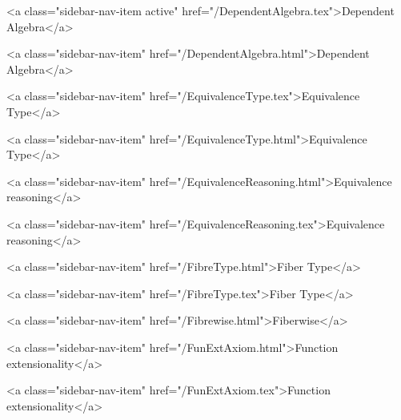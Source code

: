       
    
      
        
          <a class="sidebar-nav-item active" href="/DependentAlgebra.tex">Dependent Algebra</a>
        
      
    
      
        
          <a class="sidebar-nav-item" href="/DependentAlgebra.html">Dependent Algebra</a>
        
      
    
      
        
          <a class="sidebar-nav-item" href="/EquivalenceType.tex">Equivalence Type</a>
        
      
    
      
        
          <a class="sidebar-nav-item" href="/EquivalenceType.html">Equivalence Type</a>
        
      
    
      
        
          <a class="sidebar-nav-item" href="/EquivalenceReasoning.html">Equivalence reasoning</a>
        
      
    
      
        
          <a class="sidebar-nav-item" href="/EquivalenceReasoning.tex">Equivalence reasoning</a>
        
      
    
      
        
          <a class="sidebar-nav-item" href="/FibreType.html">Fiber Type</a>
        
      
    
      
        
          <a class="sidebar-nav-item" href="/FibreType.tex">Fiber Type</a>
        
      
    
      
        
          <a class="sidebar-nav-item" href="/Fibrewise.html">Fiberwise</a>
        
      
    
      
        
          <a class="sidebar-nav-item" href="/FunExtAxiom.html">Function extensionality</a>
        
      
    
      
        
          <a class="sidebar-nav-item" href="/FunExtAxiom.tex">Function extensionality</a>
        
